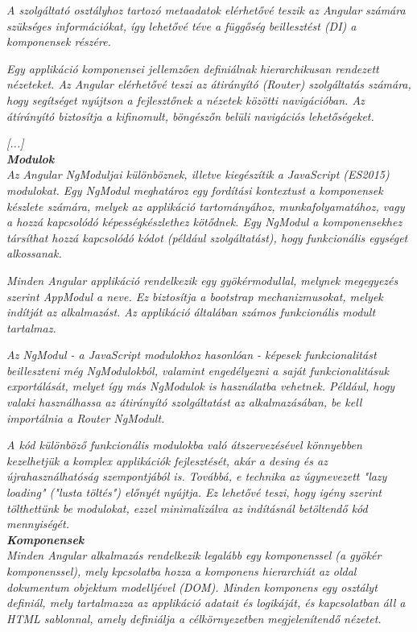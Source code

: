 \textit{A szolgáltató osztályhoz tartozó metaadatok elérhetővé teszik az Angular számára szükséges információkat, így lehetővé téve a függőség beillesztést (DI) a komponensek részére.}

\textit{Egy applikáció komponensei jellemzően definiálnak hierarchikusan rendezett nézeteket. Az Angular elérhetővé teszi az átirányító (Router) szolgáltatás számára, hogy segítséget nyújtson a fejlesztőnek a nézetek közötti navigációban. Az átírányító biztosítja a kifinomult, böngészőn belüli navigációs lehetőségeket.}

\textit{[...]}\\

\noindent\textit{\textbf{Modulok}}\\

\textit{Az Angular NgModuljai különböznek, illetve kiegészítik a JavaScript (ES2015) modulokat. Egy NgModul meghatároz egy fordítási kontextust a komponensek készlete számára, melyek az applikáció tartományához, munkafolyamatához, vagy a hozzá kapcsolódó képességkészlethez kötődnek. Egy NgModul a komponensekhez társíthat hozzá kapcsolódó kódot (például szolgáltatást), hogy funkcionális egységet alkossanak.}

\textit{Minden Angular applikáció rendelkezik egy gyökérmodullal, melynek megegyezés szerint AppModul a neve. Ez biztosítja a bootstrap mechanizmusokat, melyek indítját az  alkalmazást. Az applikáció általában számos funkcionális modult tartalmaz.}

\textit{Az NgModul - a JavaScript modulokhoz hasonlóan - képesek funkcionalitást beilleszteni még NgModulokból, valamint engedélyezni a saját funkcionalitásuk exportálását, melyet így más NgModulok is használatba vehetnek. Például, hogy valaki használhassa az átirányító szolgáltatást az alkalmazásában, be kell importálnia a Router NgModult.}

\textit{A kód különböző funkcionális modulokba való átszervezésével könnyebben kezelhetjük a komplex applikációk fejlesztését, akár a desing és az újrahasználhatóság szempontjából is. Továbbá, e technika az úgynevezett "lazy loading" ("lusta töltés") előnyét nyújtja. Ez lehetővé teszi, hogy igény szerint tölthettünk be modulokat, ezzel minimalizálva az indításnál betöltendő kód mennyiségét.}\\

\noindent\textit{\textbf{Komponensek}}\\

\textit{Minden Angular alkalmazás rendelkezik legalább egy komponenssel (a gyökér komponenssel), mely kpcsolatba hozza a komponens hierarchiát az oldal dokumentum objektum modelljével (DOM). Minden komponens egy osztályt definiál, mely tartalmazza az applikáció adatait és logikáját, és kapcsolatban áll a HTML sablonnal, amely definiálja a célkörnyezetben megjelenítendő nézetet.}

